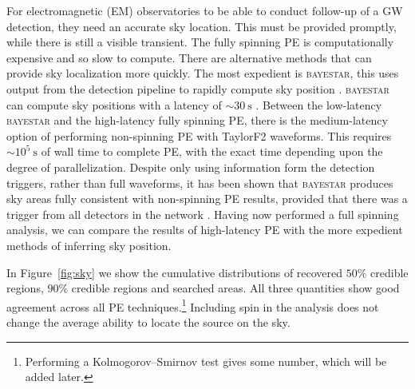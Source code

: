 For electromagnetic (EM) observatories to be able to conduct follow-up of a GW detection, they need an accurate sky location. This must be provided promptly, while there is still a visible transient. The fully spinning PE is computationally expensive and so slow to compute. There are alternative methods that can provide sky localization more quickly. The most expedient is \textsc{bayestar}, this uses output from the detection pipeline to rapidly compute sky position \citep{Singer_2014}. \textsc{bayestar} can compute sky positions with a latency of $\sim30~\mathrm{s}$ \citep{Berry_2014}. Between the low-latency \textsc{bayestar} and the high-latency fully spinning PE, there is the medium-latency option of performing non-spinning PE with TaylorF2 waveforms. This requires $\sim10^5~\mathrm{s}$ of wall time to complete PE, with the exact time depending upon the degree of parallelization. Despite only using information form the detection triggers, rather than full waveforms, it has been shown that \textsc{bayestar} produces sky areas fully consistent with non-spinning PE results, provided that there was a trigger from all detectors in the network \citep{Singer_2014,Berry_2014}. Having now performed a full spinning analysis, we can compare the results of high-latency PE with the more expedient methods of inferring sky position.

In Figure~\ref{fig:sky} we show the cumulative distributions of recovered $50\%$ credible regions, $90\%$ credible regions and searched areas. All three quantities show good agreement across all PE techniques.\footnote{Performing a Kolmogorov--Smirnov test gives some number, which will be added later.} Including spin in the analysis does not change the average ability to locate the source on the sky.
